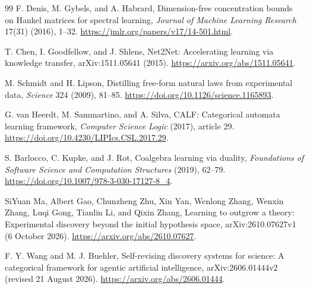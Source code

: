 \documentclass[11pt]{article}
\theoremstyle{definition}
\begin{document}
\begin{thebibliography}{99}
F. Denis, M. Gybels, and A. Habrard, Dimension-free concentration bounds on
Hankel matrices for spectral learning, \emph{Journal of Machine Learning
Research} 17(31) (2016), 1--32.
\url{https://jmlr.org/papers/v17/14-501.html}.

T. Chen, I. Goodfellow, and J. Shlens, Net2Net: Accelerating learning via
knowledge transfer, arXiv:1511.05641 (2015).
\url{https://arxiv.org/abs/1511.05641}.

M. Schmidt and H. Lipson, Distilling free-form natural laws from experimental
data, \emph{Science} 324 (2009), 81--85.
\url{https://doi.org/10.1126/science.1165893}.

G. van Heerdt, M. Sammartino, and A. Silva, CALF: Categorical automata
learning framework, \emph{Computer Science Logic} (2017), article 29.
\url{https://doi.org/10.4230/LIPIcs.CSL.2017.29}.

S. Barlocco, C. Kupke, and J. Rot, Coalgebra learning via duality,
\emph{Foundations of Software Science and Computation Structures} (2019),
62--79. \url{https://doi.org/10.1007/978-3-030-17127-8_4}.

SiYuan Ma, Albert Gao, Chunzheng Zhu, Xin Yan, Wenlong Zhang, Wenxin Zhang,
Luqi Gong, Tianlin Li, and Qixin Zhang, Learning to outgrow a theory: Experimental discovery beyond
the initial hypothesis space, arXiv:2610.07627v1 (6 October 2026).
\url{https://arxiv.org/abs/2610.07627}.

F. Y. Wang and M. J. Buehler, Self-revising discovery systems for science:
A categorical framework for agentic artificial intelligence,
arXiv:2606.01444v2 (revised 21 August 2026).
\url{https://arxiv.org/abs/2606.01444}.
\end{thebibliography}
\end{document}
